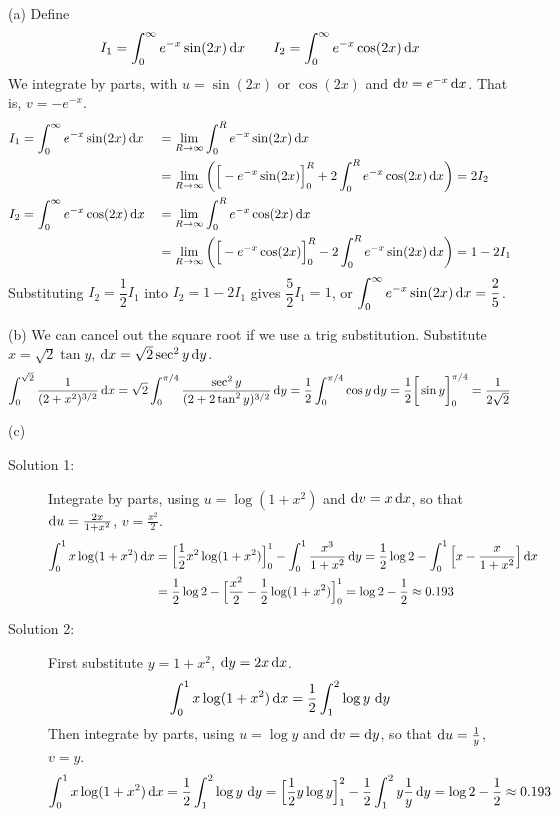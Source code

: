 \begin{solution} (a)
Define
\begin{align*}
I_1=\int_0^\infty e^{-x} \sin(2x)\,\mathrm{d}x\qquad
I_2=\int_0^\infty e^{-x} \cos(2x)\,\mathrm{d}x
\end{align*}
We integrate by parts, with $u=\sin(2x)$ or $\cos(2x)$ and $\mathrm{d}v=e^{-x}\,\mathrm{d}x$.
That is, $v=-e^{-x}$.
\begin{alignat*}{3}
I_1&=\int_0^\infty e^{-x} \sin(2x)\,\mathrm{d}x
&&=\lim_{R\rightarrow\infty}\int_0^R e^{-x} \sin(2x)\,\mathrm{d}x \\
&&&=
  \lim_{R\rightarrow\infty}\bigg(\Big[-e^{-x}\sin(2x)\Big]_0^R+2\int_0^R e^{-x} \cos(2x)\,\mathrm{d}x\bigg)
=2I_2\\
I_2&=\int_0^\infty e^{-x} \cos(2x)\,\mathrm{d}x
&&=\lim_{R\rightarrow\infty}\int_0^R e^{-x} \cos(2x)\,\mathrm{d}x \\
&&&=\lim_{R\rightarrow\infty}
\bigg(\Big[-e^{-x}\cos(2x)\Big]_0^R-2\int_0^R e^{-x} \sin(2x)\,\mathrm{d}x
                               \bigg)
=1-2I_1
\end{alignat*}
Substituting $I_2=\dfrac12 I_1$ into $I_2=1-2I_1$ gives $\dfrac{5}{2}I_1=1$,
or $\displaystyle\int_0^\infty e^{-x} \sin(2x)\,\mathrm{d}x=\dfrac{2}{5}$.

\noindent (b) We can cancel out the square root if we use a trig substitution.
Substitute $x=\sqrt{2}\tan y$, $\mathrm{d}x=\sqrt{2}\sec^2 y\,\mathrm{d}y$.
\begin{align*}
\int_0^{\sqrt{2}}\frac{1}{(2+x^2)^{3/2}}\,\mathrm{d}x
=\sqrt{2}\int_0^{\pi/4}\frac{\sec^2 y}{(2+2\tan^2y)^{3/2}}\,\mathrm{d}y
=\frac{1}{2}\int_0^{\pi/4}\cos y\,\mathrm{d}y
=\frac{1}{2} \bigg[\sin y\bigg]_0^{\pi/4}
=\frac{1}{2\sqrt{2}}
\end{align*}


\noindent (c)
\begin{description}
\item[Solution 1:]
Integrate by parts, using $u=\log(1+x^2)$ and $\mathrm{d}v=x\,\mathrm{d}x$, so that
$\mathrm{d}u=\frac{2x}{1+x^2}$, $v=\frac{x^2}{2}$.
\begin{align*}
\int_0^1 x\log(1+x^2)\,\mathrm{d}x
&=\Big[\frac{1}{2} x^2\log(1+x^2)\Big]_0^1-\int_0^1 \frac{x^3}{1+x^2}\,\mathrm{d}y
=\frac{1}{2} \log 2 -\int_0^1\Big[x-\frac{x}{1+x^2}\Big]\,\mathrm{d}x\cr
&=\frac{1}{2} \log 2 -\Big[\frac{x^2}{2}-\frac{1}{2}\log(1+x^2)\Big]_0^1
=\log 2-\frac{1}{2}\approx 0.193
\end{align*}

\item[Solution 2:]
First substitute $y=1+x^2$, $\mathrm{d}y=2x\,\mathrm{d}x$.
\begin{align*}
\int_0^1 x\log(1+x^2)\,\mathrm{d}x
=\frac{1}{2}\int_1^2\log y\ \mathrm{d}y
\end{align*}
Then integrate by parts, using $u=\log y$ and $\mathrm{d}v=\mathrm{d}y$, so that
$\mathrm{d}u=\frac{1}{y}$, $v=y$.
\begin{align*}
\int_0^1 x\log(1+x^2)\,\mathrm{d}x
=\frac{1}{2}\int_1^2\log y\ \mathrm{d}y
=\Big[\frac{1}{2} y\log y\Big]_1^2-\frac{1}{2}\int_1^2 y\frac{1}{y}\,\mathrm{d}y
=\log 2-\frac{1}{2}\approx 0.193
\end{align*}
\end{description}


\end{solution}
